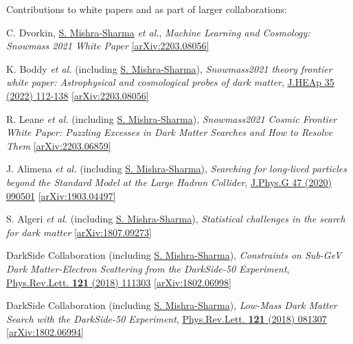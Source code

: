 \documentclass[letterpaper,11pt]{article}
\newenvironment{packed_enumerate}[1][]{
\begin{etaremune}[#1]
  \setlength{\itemsep}{3.7pt}
  \setlength{\parskip}{0pt}
  \setlength{\parsep}{0pt}}{\end{etaremune}
}
\begin{document}
\noindent
Contributions to white papers and as part of larger collaborations:

\begin{packed_enumerate}[start=7]

  \item C. Dvorkin, \underline{S. Mishra-Sharma} \emph{et al.}, \emph{Machine Learning and Cosmology: Snowmass 2021 White Paper} \href{https://arxiv.org/abs/2203.08056}{[arXiv:2203.08056]}

  \item K. Boddy \emph{et al.} (including \underline{S. Mishra-Sharma}), \emph{Snowmass2021 theory frontier white paper: Astrophysical and cosmological probes of dark matter},  \href{https://www.sciencedirect.com/science/article/pii/S2214404822000349}{J.HEAp 35 (2022) 112-138}  \href{https://arxiv.org/abs/2203.08056}{[arXiv:2203.08056]}

  \item R. Leane \emph{et al.} (including \underline{S. Mishra-Sharma}), \emph{Snowmass2021 Cosmic Frontier White Paper: Puzzling Excesses in Dark Matter Searches and How to Resolve Them} \href{https://arxiv.org/abs/2203.06859}{[arXiv:2203.06859]}

  \item J. Alimena \emph{et al.} (including \underline{S. Mishra-Sharma}), \emph{Searching for long-lived particles beyond the Standard Model at the Large Hadron Collider}, \href{https://iopscience.iop.org/article/10.1088/1361-6471/ab4574}{J.Phys.G 47 (2020) 090501} \href{https://arxiv.org/abs/1903.04497}{[arXiv:1903.04497]}

  \item S. Algeri \emph{et al.} (including \underline{S. Mishra-Sharma}), \emph{Statistical challenges in the search for dark matter} \href{https://arxiv.org/abs/1807.09273}{[arXiv:1807.09273]}

  \item DarkSide Collaboration (including \underline{S. Mishra-Sharma}), \emph{Constraints on Sub-GeV Dark Matter-Electron Scattering from the DarkSide-50 Experiment}, \href{https://journals.aps.org/prl/abstract/10.1103/PhysRevLett.121.111303}{Phys.Rev.Lett. \textbf{121} (2018) 111303} \href{https://arxiv.org/abs/1802.06998}{[arXiv:1802.06998]}

  \item DarkSide Collaboration (including \underline{S. Mishra-Sharma}), \emph{Low-Mass Dark Matter Search with the DarkSide-50 Experiment}, \href{https://journals.aps.org/prl/abstract/10.1103/PhysRevLett.121.081307}{Phys.Rev.Lett. \textbf{121} (2018) 081307}  \href{https://arxiv.org/abs/1802.06994}{[arXiv:1802.06994]}
\end{packed_enumerate}
\vspace{2.0mm}
\end{document}
